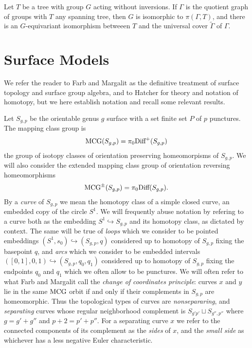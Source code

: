 \begin{theorem}
  Let $T$ be a tree with group $G$ acting without inversions. If $\Gamma$ is the quotient graph of groups with $T$ any spanning tree,
  then $G$ is isomorphic to $\pi(\Gamma, T)$,
  and there is an $G$-equivariant isomorphism betweeen $T$ and the universal cover $\tilde \Gamma$ of $\Gamma$.
  \label{thm:bassserre}
\end{theorem}

\section{Surface Models}

We refer the reader to Farb and Margalit \cite{primer} as the definitive
treatment of surface topology and surface group algebra,
and to Hatcher \cite{MR1867354} for theory and notation of homotopy,
but we here establish notation and recall
some relevant results.

Let $S_{g,p}$ be the orientable genus $g$ surface with a set finite set $P$
of $p$ punctures.
The mapping class group is
$$\operatorname{MCG}(S_{g,p}) = \pi_0 \mbox{Diff}^+(S_{g,p})$$
the group of isotopy classes of orientation preserving homeomorpisms of $S_{g,p}$.
We will also consider the extended mapping class group of orientation reversing homeomorphisms
$$\operatorname{MCG}^{\pm}(S_{g,p}) = \pi_0 \mbox{Diff}(S_{g,p}).$$
By a \emph{curve} of $S_{g,p}$
we mean the homotopy class of a simple closed curve, an embedded copy of the circle $S^1$.
We will frequently abuse notation
by refering to a curve both as the embedding $S^1 \hookrightarrow S_{g,p}$
and its homotopy class, as dictated by context.
The same will be true of \emph{loops} which we consider to be pointed embeddings $(S^1,s_0) \hookrightarrow (S_{g,p},q)$ considered up to homotopy of $S_{g,p}$ fixing the basepoint $q$,
and \emph{arcs} which we consider to be
embedded intervals $([0,1],0,1) \hookrightarrow (S_{g,p},q_0,q_1)$
considered up to homotopy of $S_{g,p}$ fixing the endpoints $q_0$ and $q_1$ which we often allow to be punctures.
We will often refer to what Farb and Margalit call the \emph{change of coordinates principle}:
curves $x$ and $y$ lie in the same $\operatorname{MCG}$ orbit if
and only if their complements in $S_{g,p}$ are homeomorphic.
Thus the topological types of curves are
\emph{nonsepararing}, and \emph{separating} curves whose regular neighborhood complement is $S_{g'p'} \sqcup S_{g'',p''}$
where
$g=g'+g''$ and $p+2=p'+p''$.
For a separating curve $x$
we refer to the connected components of its complement as the \emph{sides}
of $x$, and the \emph{small side} as whichever has a less negative Euler characteristic.

